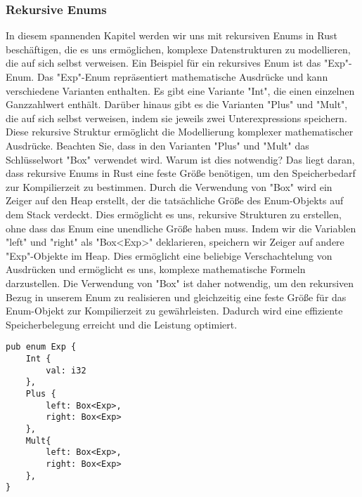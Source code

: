 \documentclass[a4paper, 1ppt]{article}
\begin{document}
\subsubsection{Rekursive Enums}
In diesem spannenden Kapitel werden wir uns mit rekursiven Enums in Rust beschäftigen, die es uns ermöglichen, komplexe Datenstrukturen zu modellieren, die auf sich selbst verweisen. Ein Beispiel für ein rekursives Enum ist das "Exp"-Enum.
Das "Exp"-Enum repräsentiert mathematische Ausdrücke und kann verschiedene Varianten enthalten. Es gibt eine Variante "Int", die einen einzelnen Ganzzahlwert enthält. Darüber hinaus gibt es die Varianten "Plus" und "Mult", die auf sich selbst verweisen, indem sie jeweils zwei Unterexpressions speichern. Diese rekursive Struktur ermöglicht die Modellierung komplexer mathematischer Ausdrücke.
Beachten Sie, dass in den Varianten "Plus" und "Mult" das Schlüsselwort "Box" verwendet wird. Warum ist dies notwendig? Das liegt daran, dass rekursive Enums in Rust eine feste Größe benötigen, um den Speicherbedarf zur Kompilierzeit zu bestimmen. Durch die Verwendung von "Box" wird ein Zeiger auf den Heap erstellt, der die tatsächliche Größe des Enum-Objekts auf dem Stack verdeckt. Dies ermöglicht es uns, rekursive Strukturen zu erstellen, ohne dass das Enum eine unendliche Größe haben muss.
Indem wir die Variablen "left" und "right" als "Box<Exp>" deklarieren, speichern wir Zeiger auf andere "Exp"-Objekte im Heap. Dies ermöglicht eine beliebige Verschachtelung von Ausdrücken und ermöglicht es uns, komplexe mathematische Formeln darzustellen.
Die Verwendung von "Box" ist daher notwendig, um den rekursiven Bezug in unserem Enum zu realisieren und gleichzeitig eine feste Größe für das Enum-Objekt zur Kompilierzeit zu gewährleisten. Dadurch wird eine effiziente Speicherbelegung erreicht und die Leistung optimiert.
\begin{verbatim}
pub enum Exp {
    Int {
        val: i32
    },
    Plus {
        left: Box<Exp>,
        right: Box<Exp>
    },
    Mult{
        left: Box<Exp>,
        right: Box<Exp>
    },
}
\end{verbatim}
\end{document}
